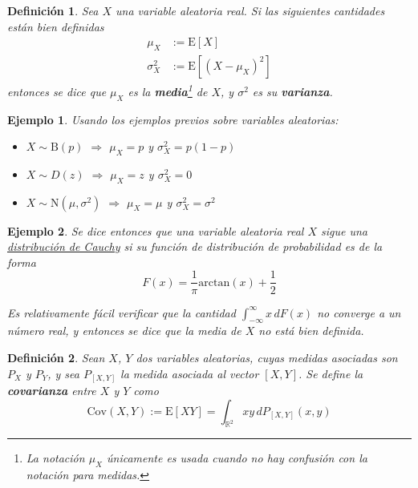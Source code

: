 \documentclass[12pt,letterpaper]{book}
\newtheorem{definicion}{Definición}[chapter]
\newtheorem{ejemplo}{Ejemplo}[chapter]
\newcommand{\R}{\mathbb{R}}
\newcommand{\intR}{\int_{-\infty}^{\infty}}
\newcommand{\E}[1]{\mathrm{E}\left[ #1 \right]}
\newcommand{\Cov}[1]{\mathrm{Cov}\left( #1 \right)}
\begin{document}
\begin{definicion}
Sea $X$ una variable aleatoria real. Si las siguientes cantidades están bien definidas
\begin{align}
\mu_X &{:=} \E{X} \\
\sigma_X^{2} &{:=} \E{(X-\mu_X)^{2}}
\end{align}
entonces se dice que $\mu_X$ es la \textbf{media}\footnote{La notación $\mu_X$ únicamente es usada cuando no hay confusión con la notación para medidas.} de $X$, y $\sigma^2$ es su \textbf{varianza}.
\end{definicion}

\begin{ejemplo}
Usando los ejemplos previos sobre variables aleatorias:
\begin{itemize}
\item $X\sim \text{B}(p)$ $\Rightarrow$ $\mu_X = p$ y $\sigma^2_X = p(1-p)$
\item $X\sim D(z)$ $\Rightarrow$ $\mu_X = z$ y $\sigma^2_X = 0$
\item $X\sim \text{N}(\mu,\sigma^{2})$ $\Rightarrow$ $\mu_X = \mu$ y $\sigma^2_X = \sigma^2$
\end{itemize}
\end{ejemplo}

\begin{ejemplo}
Se dice entonces que una variable aleatoria real $X$ sigue una \ul{distribuci\'on de Cauchy} si su función de distribución de probabilidad es de la forma
\begin{equation}
F(x) = \frac{1}{\pi} \mathrm{arc tan}\left( x \right) + \frac{1}{2}
\end{equation}

Es relativamente fácil verificar que la cantidad $\intR x\, dF(x)$ no converge a un número real, y entonces se dice que la media de $X$ no está \textit{bien definida}.
\end{ejemplo}

\begin{definicion}
Sean $X$, $Y$ dos variables aleatorias, cuyas medidas asociadas son $P_X$ y $P_Y$, y sea $P_{[X,Y]}$ la medida asociada al vector $[X,Y]$. Se define la \textbf{covarianza} entre $X$ y $Y$ como
\begin{equation}
\Cov{X,Y} := \E{X Y} = \int_{\R^{2}} x y\, d P_{[X,Y]}(x,y)
\end{equation}
\end{definicion}
\end{document}
